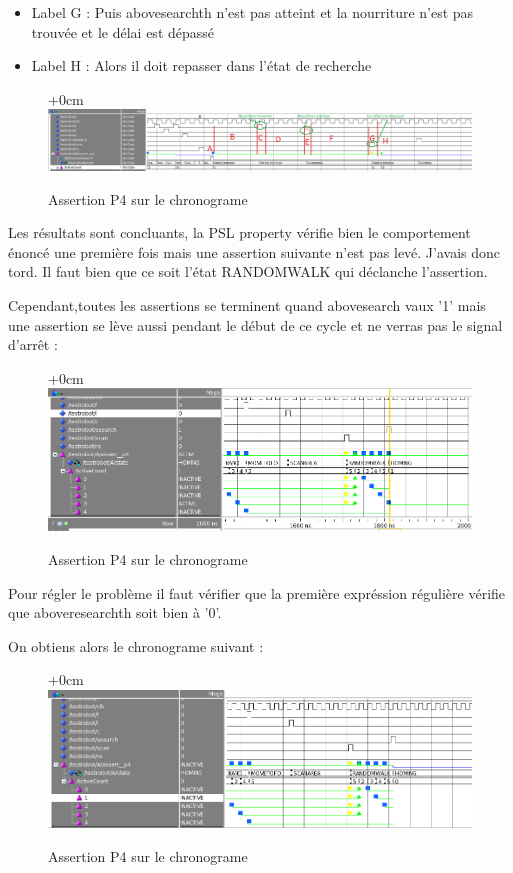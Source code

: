 \documentclass{article}
\begin{document}
\begin{landscape}
\begin{itemize}
\item Label G :  Puis abovesearchth n'est pas atteint et la nourriture n'est pas trouvée
et le délai est dépassé 

\item Label H : Alors il doit repasser dans l'état de recherche


\end{itemize}

\begin{figure}[!h]
\advance\leftskip+0cm
\includegraphics[scale=0.6]{PSL/P4-2.PNG}
\caption{Assertion P4 sur le chronograme }
\end{figure}

Les résultats sont concluants, la PSL property vérifie bien le comportement énoncé une première fois mais une assertion suivante n'est pas levé. J'avais donc tord. Il faut bien que ce soit l'état RANDOMWALK qui déclanche l'assertion. 

Cependant,toutes les assertions se terminent quand abovesearch vaux '1' mais une assertion se lève aussi pendant le début de ce cycle et ne verras pas le signal d'arrêt :

\end{landscape}
\newpage
\begin{figure}[!h]
\advance\leftskip+0cm
\includegraphics[scale=0.6]{PSL/P4-3.PNG}
\caption{Assertion P4 sur le chronograme }
\end{figure}

Pour régler le problème il faut vérifier que la première expréssion régulière vérifie que aboveresearchth soit bien à '0'.

On obtiens alors le chronograme suivant : 

\begin{figure}[!h]
\advance\leftskip+0cm
\includegraphics[scale=0.6]{PSL/P4-4.PNG}
\caption{Assertion P4 sur le chronograme }
\end{figure}
\end{document}
